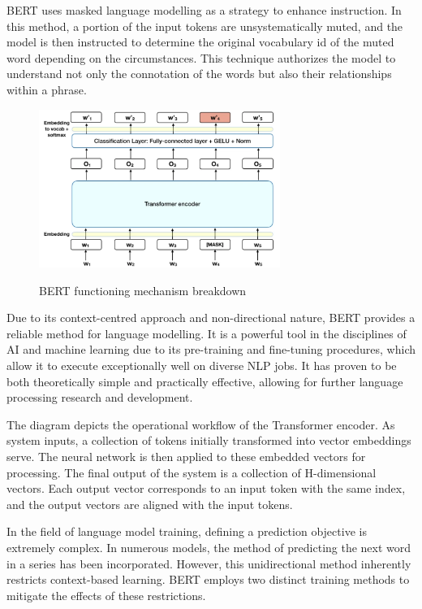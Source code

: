 BERT uses masked language modelling as a strategy to enhance instruction. In this method, a portion of the input tokens are unsystematically muted, and the model is then instructed to determine the original vocabulary id of the muted word depending on the circumstances. This technique authorizes the model to understand not only the connotation of the words but also their relationships within a phrase.

\begin{figure}[!h]
    \centering
    \includegraphics[width=0.7\textwidth]{images/mlm.png}
    \label{fig:mlm}
    \caption{BERT functioning mechanism breakdown\cite{towardsdatascience}}
\end{figure}



Due to its context-centred approach and non-directional nature, BERT provides a reliable method for language modelling. It is a powerful tool in the disciplines of AI and machine learning due to its pre-training and fine-tuning procedures, which allow it to execute exceptionally well on diverse NLP jobs. It has proven to be both theoretically simple and practically effective, allowing for further language processing research and development.

The diagram depicts the operational workflow of the Transformer encoder. As system inputs, a collection of tokens initially transformed into vector embeddings serve. The neural network is then applied to these embedded vectors for processing. The final output of the system is a collection of H-dimensional vectors. Each output vector corresponds to an input token with the same index, and the output vectors are aligned with the input tokens.



In the field of language model training, defining a prediction objective is extremely complex. In numerous models, the method of predicting the next word in a series has been incorporated. However, this unidirectional method inherently restricts context-based learning. BERT employs two distinct training methods to mitigate the effects of these restrictions.





